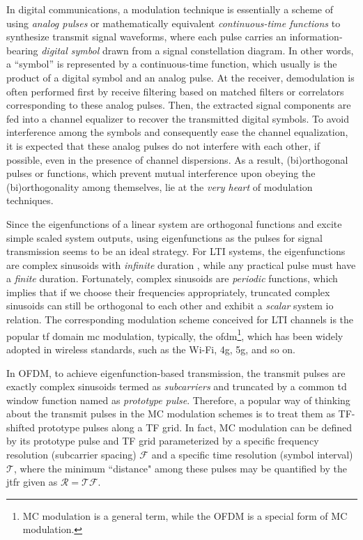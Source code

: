 \documentclass[journal]{IEEEtran}
\begin{document}
In digital communications, a modulation technique is essentially a scheme of using \emph{analog pulses} or mathematically equivalent \emph{continuous-time functions} to synthesize transmit signal waveforms, where each pulse carries an information-bearing \emph{digital symbol} drawn from a signal constellation diagram\cite{Jacobs_pce}. In other words, a ``symbol” is represented by a continuous-time function, which usually is the product of a digital symbol and an analog pulse. At the receiver, demodulation is often performed first by receive filtering based on matched filters or correlators corresponding to these analog pulses. Then, the extracted signal components are fed into a channel equalizer to recover the transmitted digital symbols. To avoid interference among the symbols and consequently ease the channel equalization, it is expected that these analog pulses do not interfere with each other, if possible, even in the presence of channel dispersions.
As a result, (bi)orthogonal pulses or functions, which prevent mutual interference upon obeying the (bi)orthogonality among themselves, lie at the \emph{very heart} of modulation techniques.

Since the eigenfunctions of a linear system are orthogonal functions and excite simple scaled system outputs, using eigenfunctions as the pulses for signal transmission seems to be an ideal strategy.
For LTI systems, the eigenfunctions are complex sinusoids with \emph{infinite} duration \cite{sigsyt}, while any practical pulse must have a \emph{finite} duration. Fortunately, complex sinusoids are \emph{periodic} functions, which implies that if we choose their frequencies
appropriately, truncated complex sinusoids can still be orthogonal to each other and exhibit a \emph{scalar} system \ac{io} relation.
The corresponding modulation scheme conceived for LTI channels is the popular \ac{tf} domain \ac{mc} modulation, typically, the \ac{ofdm}\cite{fwc,ofdm,tff,mct}\footnote{MC modulation is a general term, while the OFDM is a special form of MC modulation\cite{ofdm}.}, which has been widely adopted in wireless standards, such as the Wi-Fi\cite{80211a,80211ac}, \ac{4g}\cite{4Gbook}, \ac{5g}\cite{5Gbook}, and so on.

In OFDM, to achieve eigenfunction-based transmission, the transmit pulses are exactly complex sinusoids termed as \emph{subcarriers} and truncated by a common \ac{td} window function named as \emph{prototype pulse}\cite{tff}.
Therefore, a popular way of thinking about the transmit pulses in the MC modulation schemes is to treat them as TF-shifted prototype pulses along a TF grid.
In fact, MC modulation can be defined by its prototype pulse and TF grid parameterized by a specific frequency resolution (subcarrier spacing) $\mathcal F$ and a specific time resolution (symbol interval) $\mathcal T$, where the minimum ``distance" among these pulses may be quantified by the \ac{jtfr} given as $\mathcal R= \mathcal T \mathcal F$.
\end{document}
